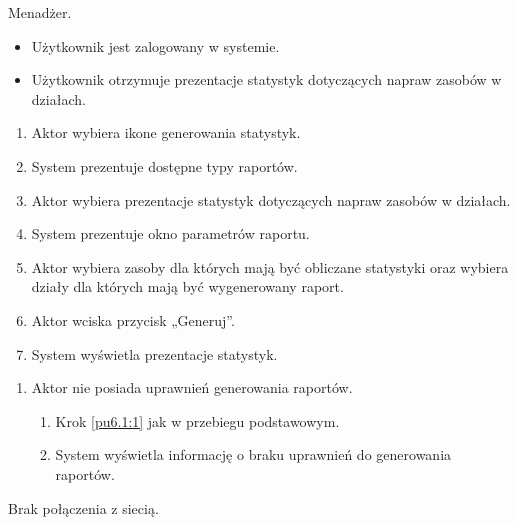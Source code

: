 Menadżer.

\begin{itemize}
\item Użytkownik jest zalogowany w systemie.
\end{itemize}

\begin{itemize}
\item Użytkownik otrzymuje prezentacje statystyk dotyczących napraw zasobów w działach.
\end{itemize}

\begin{enumerate}
	\item \label{pu7.2.3:1} Aktor wybiera ikone generowania statystyk.
	\item System prezentuje dostępne typy raportów.
	\item \label{pu7.2.3:2} Aktor wybiera prezentacje statystyk dotyczących napraw zasobów w działach.
	\item System prezentuje okno parametrów raportu.
	\item Aktor wybiera zasoby dla których mają być obliczane statystyki oraz wybiera działy dla których mają być wygenerowany raport.
	\item Aktor wciska przycisk „Generuj”.
	\item System wyświetla prezentacje statystyk.
\end{enumerate}

\begin{enumerate}
	\item Aktor nie posiada uprawnień generowania raportów.
	\begin{enumerate}[label*=\arabic*.]
		\item Krok \ref{pu6.1:1} jak w przebiegu podstawowym.
		\item System wyświetla informację o braku uprawnień do generowania raportów.
	\end{enumerate}
\end{enumerate}

Brak połączenia z siecią.

